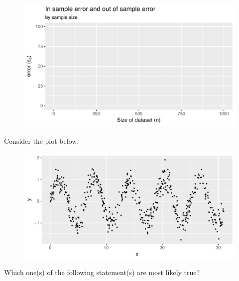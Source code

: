 \documentclass[12pt]{article}
\begin{document}
\begin{figure}[htp]
\centering
\includegraphics[width=5.35in]{n_increasing}
\end{figure}


 Consider the plot below. 


\begin{figure}[htp]
\centering
\includegraphics[width=5.5in]{sine}
\end{figure}

Which one(s) of the following statement(s) are most likely true?
\end{document}
